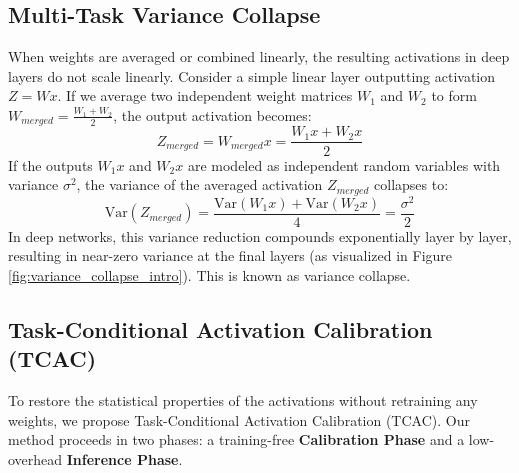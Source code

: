 \documentclass{article}
\theoremstyle{plain}
\theoremstyle{definition}
\theoremstyle{remark}
\begin{document}
\subsection{Multi-Task Variance Collapse}
When weights are averaged or combined linearly, the resulting activations in deep layers do not scale linearly. Consider a simple linear layer outputting activation $Z = W x$. If we average two independent weight matrices $W_1$ and $W_2$ to form $W_{merged} = \frac{W_1 + W_2}{2}$, the output activation becomes:
\begin{equation}
Z_{merged} = W_{merged} x = \frac{W_1 x + W_2 x}{2}
\end{equation}
If the outputs $W_1 x$ and $W_2 x$ are modeled as independent random variables with variance $\sigma^2$, the variance of the averaged activation $Z_{merged}$ collapses to:
\begin{equation}
\text{Var}(Z_{merged}) = \frac{\text{Var}(W_1 x) + \text{Var}(W_2 x)}{4} = \frac{\sigma^2}{2}
\end{equation}
In deep networks, this variance reduction compounds exponentially layer by layer, resulting in near-zero variance at the final layers (as visualized in Figure \ref{fig:variance_collapse_intro}). This is known as variance collapse.

\subsection{Task-Conditional Activation Calibration (TCAC)}
To restore the statistical properties of the activations without retraining any weights, we propose Task-Conditional Activation Calibration (TCAC). 
Our method proceeds in two phases: a training-free \textbf{Calibration Phase} and a low-overhead \textbf{Inference Phase}.
\end{document}
